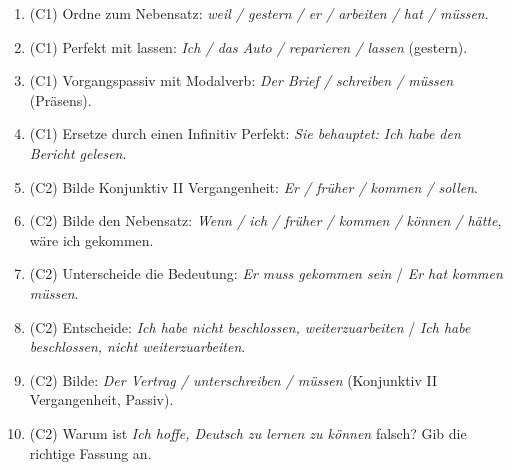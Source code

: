 \documentclass[a4paper,11pt]{article}
\begin{document}
\begin{enumerate}[label=\textbf{\arabic*.},start=9]
\item (C1) Ordne zum Nebensatz: \textit{weil / gestern / er / arbeiten / hat / müssen}.
\item (C1) Perfekt mit lassen: \textit{Ich / das Auto / reparieren / lassen} (gestern).
\item (C1) Vorgangspassiv mit Modalverb: \textit{Der Brief / schreiben / müssen} (Präsens).
\item (C1) Ersetze durch einen Infinitiv Perfekt: \textit{Sie behauptet: Ich habe den Bericht gelesen}.
\item (C2) Bilde Konjunktiv II Vergangenheit: \textit{Er / früher / kommen / sollen}.
\item (C2) Bilde den Nebensatz: \textit{Wenn / ich / früher / kommen / können / hätte}, wäre ich gekommen.
\item (C2) Unterscheide die Bedeutung: \textit{Er muss gekommen sein} / \textit{Er hat kommen müssen}.
\item (C2) Entscheide: \textit{Ich habe nicht beschlossen, weiterzuarbeiten} / \textit{Ich habe beschlossen, nicht weiterzuarbeiten}.
\item (C2) Bilde: \textit{Der Vertrag / unterschreiben / müssen} (Konjunktiv II Vergangenheit, Passiv).
\item (C2) Warum ist \textit{Ich hoffe, Deutsch zu lernen zu können} falsch? Gib die richtige Fassung an.
\end{enumerate}
\end{document}
